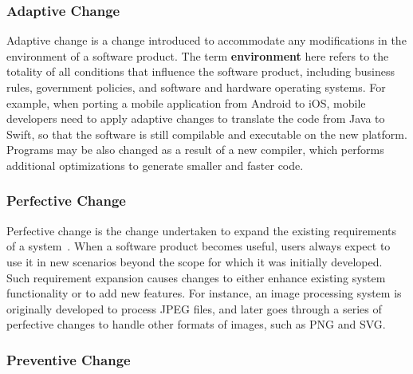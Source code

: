 \documentclass[runningheads,a4paper]{llncs}
\begin{document}
\subsubsection{Adaptive Change}

Adaptive change is a change introduced to accommodate any modifications in the environment of a software product. The term \textbf{environment} here refers to the totality of all conditions that influence the software product, including business rules, government policies, and software and hardware operating systems. For example, when porting a mobile application from Android to iOS, mobile developers need to apply adaptive changes to translate the code from Java to Swift, so that the software is still compilable and executable on the new platform. Programs may be also changed as a result of a new compiler, which performs additional optimizations to generate smaller and faster code. 

\subsubsection{Perfective Change}

Perfective change is the change undertaken to expand the existing requirements of a system~\cite{Seaman2008:SMC}. When a software product becomes useful, users always expect to use it in new scenarios beyond the scope for which it was initially developed. Such requirement expansion causes changes to either enhance existing system functionality or to add new features. For instance, an image processing system is originally developed to process JPEG files, and later goes through a series of perfective changes to handle other formats of images, such as PNG and SVG.

\subsubsection{Preventive Change}
\end{document}
